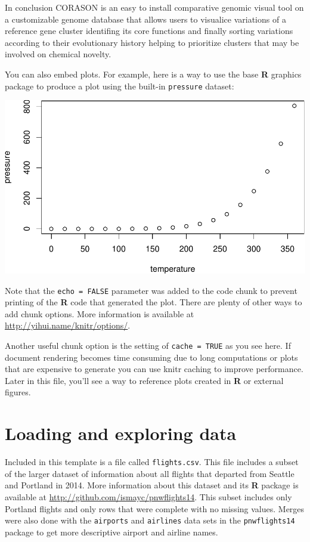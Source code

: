 \documentclass[12pt,twoside]{reedthesis}
\begin{document}
  In conclusion CORASON is an easy to install comparative genomic visual
  tool on a customizable genome database that allows users to visualice
  variations of a reference gene cluster identifing its core functions and
  finally sorting variations according to their evolutionary history
  helping to prioritize clusters that may be involved on chemical novelty.
  
  You can also embed plots. For example, here is a way to use the base
  \textbf{R} graphics package to produce a plot using the built-in
  \texttt{pressure} dataset:
  
  \begin{center}\includegraphics{tesis_files/figure-latex/pressure-1} \end{center}
  
  Note that the \texttt{echo\ =\ FALSE} parameter was added to the code
  chunk to prevent printing of the \textbf{R} code that generated the
  plot. There are plenty of other ways to add chunk options. More
  information is available at \url{http://yihui.name/knitr/options/}.
  
  Another useful chunk option is the setting of \texttt{cache\ =\ TRUE} as
  you see here. If document rendering becomes time consuming due to long
  computations or plots that are expensive to generate you can use knitr
  caching to improve performance. Later in this file, you'll see a way to
  reference plots created in \textbf{R} or external figures.
  
  \section{Loading and exploring data}\label{loading-and-exploring-data}
  
  Included in this template is a file called \texttt{flights.csv}. This
  file includes a subset of the larger dataset of information about all
  flights that departed from Seattle and Portland in 2014. More
  information about this dataset and its \textbf{R} package is available
  at \url{http://github.com/ismayc/pnwflights14}. This subset includes
  only Portland flights and only rows that were complete with no missing
  values. Merges were also done with the \texttt{airports} and
  \texttt{airlines} data sets in the \texttt{pnwflights14} package to get
  more descriptive airport and airline names.
  
\end{document}
